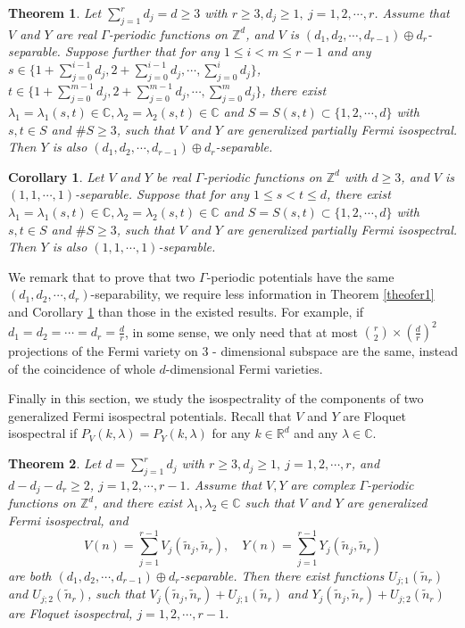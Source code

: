 \documentclass[12pt,letterpaper]{amsart}
\newtheorem{corollary}{Corollary}[section]
\newtheorem{theorem}{Theorem}[section]
\def\R{{\mathbb R}}
\def\C{{\mathbb C}}
\def\Z{{\mathbb Z}}
\begin{document}
{\begin{theorem}
	Let $\sum_{j=1}^rd_j=d\geq 3$ with $r\geq 3,d_j\geq1,\ j=1,2,\cdots,r$. Assume that $V$ and $Y$ are real $\Gamma$-periodic functions on $\Z^d$, and $V$ is $(d_1,d_2,\cdots,d_{r-1})\oplus d_r$-separable. Suppose further that for any $1\leq i<m\leq r-1$ and any $s\in \{1+\sum_{j=0}^{i-1}d_j,2+\sum_{j=0}^{i-1}d_j,\cdots,\sum_{j=0}^{i}d_j\}$, $t\in \{1+\sum_{j=0}^{m-1}d_j,2+\sum_{j=0}^{m-1}d_j,\cdots,\sum_{j=0}^{m}d_j\}$, there exist $\lambda_1=\lambda_1(s,t)\in\C,\lambda_2=\lambda_2(s,t)\in\C$ and $S=S(s,t)\subset \{1,2,\cdots,d\}$ with $s,t\in S$ and  $\# S\geq 3$, such that $V$ and $Y$ are generalized partially Fermi isospectral. Then $Y$ is also $(d_1,d_2,\cdots,d_{r-1})\oplus d_r$-separable.
\end{theorem}}

\begin{corollary}\label{maincorfermi}
Let $V$ and $Y$ be real $\Gamma$-periodic functions on $\Z^d$ with $d\geq 3$, and $V$ is $(1,1,\cdots,1)$-separable. Suppose that for any $1\leq s<t\leq d$, there exist {$\lambda_1=\lambda_1(s,t)\in\C,\lambda_2=\lambda_2(s,t)\in\C$ and $S=S(s,t)\subset \{1,2,\cdots,d\}$} with $s,t\in S$ and $\# S\geq 3$, such that $V$ and $Y$ are {generalized partially Fermi isospectral}. Then $Y$ is also $(1,1,\cdots,1)$-separable.
\end{corollary}


We remark that to prove that two $\Gamma$-periodic potentials have the same $(d_1,d_2,\cdots,d_r)$-separability, we require less information in Theorem \ref{theofer1} and Corollary \ref{maincorfermi} {than those in the existed results}. For example, if $d_1=d_2=\cdots=d_r=\frac{d}{r}$, in some sense, we only need that at most $\binom{r}{2}\times \left(\frac{d}{r}\right)^2$
projections of the Fermi variety on $3$ - dimensional subspace are the same, instead of the coincidence of whole $d$-dimensional Fermi varieties.


Finally in this section, we study the isospectrality of the components of two generalized Fermi isospectral potentials.
Recall that $V$ and $Y$ are Floquet isospectral if $P_V(k,\lambda)=P_Y(k,\lambda)$ for any $k\in\R^d$ and any $\lambda\in\C$.


{\begin{theorem}\label{maintheorem325fer}
Let $d=\sum_{j=1}^rd_j$ with $r\geq 3,d_j\geq 1,\ j=1,2,\cdots,r$, and $d-d_j-d_r\geq 2$, $j=1,2,\cdots,r-1$.
Assume that $V,Y$ are complex $\Gamma$-periodic functions on $\mathbb{Z}^d$, and there exist $\lambda_1,\lambda_2\in\C$ such that $V$ and $Y$ are generalized Fermi isospectral, and
\[V(n)=\sum_{j=1}^{r-1} V_j(\tilde{n}_j,\tilde{n}_r),\quad Y(n)=\sum_{j=1}^{r-1} Y_j(\tilde{n}_j,\tilde{n}_r)\] are both $(d_1,d_2,\cdots,d_{r-1})\oplus d_r$-separable. Then there exist functions $U_{j;1}(\tilde{n}_r)$ and $U_{j;2}(\tilde{n}_r)$, such that $V_j(\tilde{n}_{j},\tilde{n}_r)+U_{j;1}(\tilde{n}_r)$ and $Y_j(\tilde{n}_{j},\tilde{n}_r)+U_{j;2}(\tilde{n}_r)$ are Floquet isospectral, $j=1,2,\cdots,r-1$.
\end{theorem}}
\end{document}
